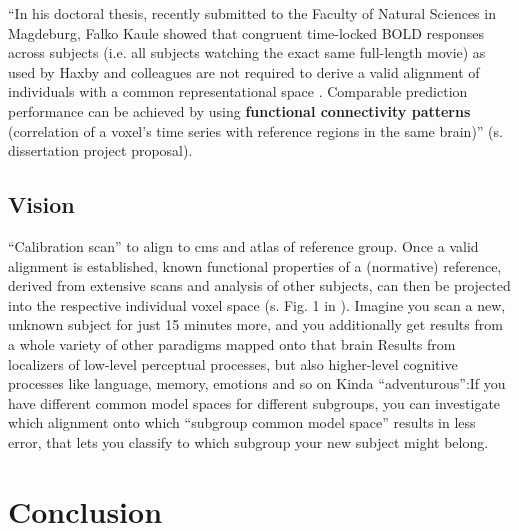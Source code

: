 
``In his doctoral thesis, recently submitted to the Faculty of Natural Sciences
in Magdeburg, Falko Kaule showed that congruent time-locked BOLD responses
across subjects (i.e. all subjects watching the exact same full-length movie) as
used by Haxby and colleagues are not required to derive a valid alignment of
individuals with a common representational space \citep{kaule2017examination}.
%
Comparable prediction performance can be achieved by using \textbf{functional
connectivity patterns} (correlation of a voxel's time series with reference
regions in the same brain)'' (s. dissertation project proposal).


\citep{nastase2019leveraging}


\subsection{Vision}

``Calibration scan'' to align to \ac{cms} and atlas of reference group.
%
Once a valid alignment is established, known functional properties of a
(normative) reference, derived from extensive scans and analysis of other
subjects, can then be projected into the respective individual voxel space (s.
Fig. 1 in \citep{nishimoto2016lining}).
%
Imagine you scan a new, unknown subject for just 15 minutes more, and you
additionally get results from a whole variety of other paradigms mapped onto
that brain
%
Results from localizers of low-level perceptual processes, but also higher-level
cognitive processes like language, memory, emotions and so on
%
Kinda ``adventurous'':If you have different common model spaces for different
subgroups, you can investigate which alignment onto which ``subgroup common
model space'' results in less error, that lets you classify to which subgroup
your new subject might belong.


\section{Conclusion}
